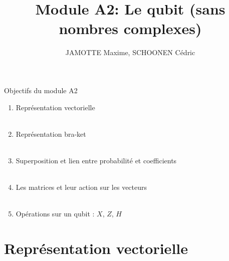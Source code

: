 \documentclass[aspectratio=169,12pt]{beamer}
\title[Module A2]{Module A2: Le qubit (sans nombres complexes)}
\author{JAMOTTE Maxime, SCHOONEN Cédric}
\institute{Digital Learning Hub}
\date{}
\begin{document}
\begin{frame}
  \titlepage
\end{frame}

\begin{frame}{Objectifs du module A2}
  \begin{enumerate}
    \item Représentation vectorielle\\~\\
    \item Représentation bra-ket\\~\\
    \item Superposition et lien entre probabilité et coefficients\\~\\
    \item Les matrices et leur action sur les vecteurs\\~\\
    \item Opérations sur un qubit : $X$, $Z$, $H$
  \end{enumerate}
\end{frame}

\section{Représentation vectorielle}
\end{document}
